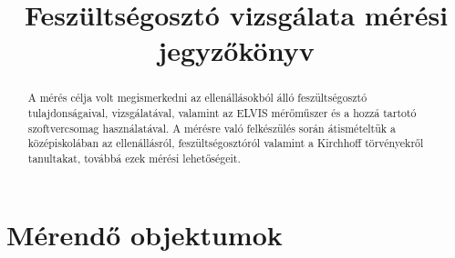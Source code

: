 \documentclass[10pt, conference,a4paper]{ITKproc}
\begin{document}
\title{Feszültségosztó vizsgálata mérési jegyzőkönyv}
\author{
}


\maketitle

\begin{abstract}
A mérés célja volt megismerkedni az ellenállásokból álló feszültségosztó tulajdonságaival, vizsgálatával, valamint az ELVIS mérőműszer és a hozzá tartotó szoftvercsomag használatával. A mérésre való felkészülés során átismételtük a középiskolában az ellenállásról, feszültségosztóról valamint a Kirchhoff törvényekről tanultakat, továbbá ezek mérési lehetőségeit. 
\end{abstract}

\IEEEpeerreviewmaketitle
\section{Mérendő objektumok}
\end{document}
